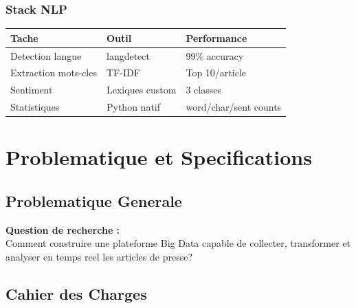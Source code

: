 \documentclass[12pt,a4paper]{report}
\begin{document}
\subsection{Stack NLP}

\begin{table}[H]
\centering
\begin{tabular}{lll}
\toprule
\textbf{Tache} & \textbf{Outil} & \textbf{Performance} \\
\midrule
Detection langue & langdetect & 99\% accuracy \\
Extraction mots-cles & TF-IDF & Top 10/article \\
Sentiment & Lexiques custom & 3 classes \\
Statistiques & Python natif & word/char/sent counts \\
\bottomrule
\end{tabular}
\end{table}


\chapter{Problematique et Specifications}

\section{Problematique Generale}

\begin{mdframed}[backgroundcolor=gray!10]
\textbf{Question de recherche :}\\
Comment construire une plateforme Big Data capable de collecter, transformer et analyser en temps reel les articles de presse?
\end{mdframed}

\section{Cahier des Charges}
\end{document}
